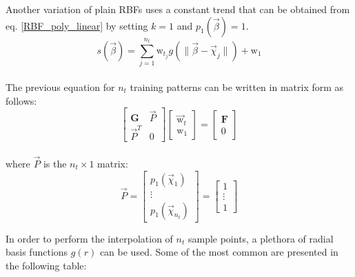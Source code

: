 Another variation of plain RBFs uses a constant trend that can be 
obtained from eq. \ref{RBF_poly_linear} by setting $k=1$ 
and $p_{1}(\vec{β}) = 1$.
\begin{equation}
s(\vec{β}) =  \sum_{j=1}^{n_{t}} 
\mathrm{w}_{t_{j}} g \left( \lVert \vec{β} - \vec{χ}_{j} 
\rVert \right) + {\mathrm{w}_{1}}
\end{equation}
\\[-0.3cm]
The previous equation for $n_{t}$ training patterns can 
be written in matrix form as follows:
\begin{equation}
\begin{bmatrix}
\mathbf{G} & \vec{P} \\
\vec{P}^{T} & 0
\end{bmatrix}
	\begin{bmatrix}
	\vec{\mathrm{w}}_{t} \\ \mathrm{w}_{1}
	\end{bmatrix}
=
\begin{bmatrix}
\mathbf{F} \\ 0
\end{bmatrix}
\end{equation}
\\
where $\vec{P}$ is the $n_{t} \times 1$ matrix:
\begin{equation}
\vec{P} = 
\begin{bmatrix}
p_{1}(\vec{χ}_{1}) \\ \vdots \\ p_{1}(\vec{χ}_{n_{t}})
\end{bmatrix}
= 
\begin{bmatrix}
1 \\ \vdots \\ 1 
\end{bmatrix}
\end{equation}

\newpage


In order to perform the interpolation of $n_{t}$ sample
points, a plethora of radial basis functions $g(r)$ 
can be used. Some of the most common are presented in the
following table:

